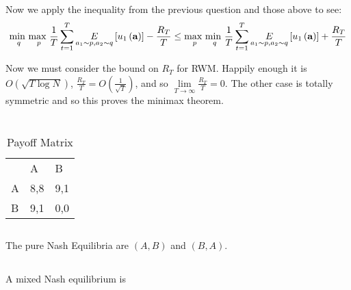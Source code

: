\documentclass[]{article}
\begin{document}
\noindent Now we apply the inequality from the previous question and those above to see:
\begin{equation}
	\underset{q}{\text{min }}\underset{p}{\text{max }}\frac{1}{T}\sum_{t=1}^{T}\underset{a_1 \sim p, a_2 \sim q}{E}\left[u_1\left(\textbf{a}\right)\right] - \frac{R_T}{T}
	\le
	\underset{p}{\text{max }}\underset{q}{\text{min }}\frac{1}{T}\sum_{t=1}^{T}\underset{a_1 \sim p, a_2 \sim q}{E}\left[u_1\left(\textbf{a}\right)\right] + \frac{R_T}{T}
\notag
\end{equation}

\noindent Now we must consider the bound on $R_T$ for RWM. Happily enough it is $O\left(\sqrt{T \log N}\right)$, $\frac{R_T}{T} = O\left(\frac{1}{\sqrt{T}}\right)$, and so $\lim\limits_{T \rightarrow \infty} \frac{R_T}{T} = 0$. The other case is totally symmetric and so this proves the minimax theorem.
\section{}
\begin{table}[H]
	\centering
	\caption{Payoff Matrix}
	\label{fig:C3}
	\begin{tabular}{lll}
		& A                        & B                        \\ \cline{2-3} 
		\multicolumn{1}{l|}{A} & \multicolumn{1}{l|}{8,8} & \multicolumn{1}{l|}{9,1} \\ \cline{2-3} 
		\multicolumn{1}{l|}{B} & \multicolumn{1}{l|}{9,1} & \multicolumn{1}{l|}{0,0} \\ \cline{2-3} 
	\end{tabular}
\end{table}
\subsection{}
The pure Nash Equilibria are $\left( A, B \right)$ and $\left( B, A \right)$.
\subsection{}
A mixed Nash equilibrium is 
\subsection{}
\end{document}
